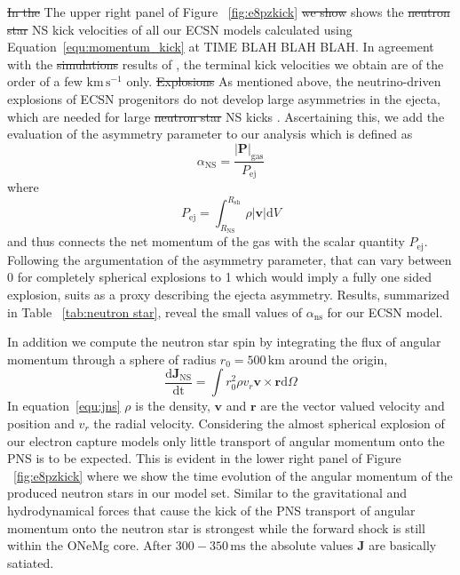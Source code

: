 \documentclass[fleqn,usenatbib]{mnras}
\newcommand{\ud}{\ensuremath{\mathrm{d}}}
\newcommand{\kms}{\ensuremath{\mathrm{km\, s^{-1}}}\xspace}
\newcommand{\NY}[2]{{\color{blue}\sout{#1}#2}}
\begin{document}
\NY{In the}{ The} upper right panel of Figure ~\ref{fig:e8pzkick} \NY{we show}{ shows} the \NY{neutron star}{ NS} kick velocities of all our ECSN models \NY{}{ calculated using Equation~\eqref{equ:momentum_kick} at TIME BLAH BLAH BLAH}. In agreement with the \NY{simulations}{ results} of \citet{Gessner2018}\NY{}{,} the terminal kick velocities \NY{}{we obtain} are of the order of a few $\kms$ only. \NY{Explosions}{ As mentioned above, the neutrino-driven explosions} of ECSN progenitors do not develop large asymmetries in the ejecta, which are needed for large \NY{neutron star}{ NS} kicks \cite{Scheck2006,Janka2017,Gessner2018}. Ascertaining this, we add the evaluation of the asymmetry parameter to our analysis which is defined as 
\begin{equation}
    \alpha_{\mathrm{NS}} = \frac{|\mathbf{P}|_{\mathrm{gas}}}{P_{\mathrm{ej}}}
\end{equation}
where 
\begin{equation}
P_{\mathrm{ej}}=\int_{R_{\mathrm{NS}}}^{R_{\mathrm{sh}}}\rho |\mathbf{v}| \ud V
\end{equation}
and thus connects the net momentum of the gas with the scalar quantity $P_{\mathrm{ej}}$. Following the argumentation of \cite{Gessner2018} the asymmetry parameter, that can vary between 0 for completely spherical explosions to 1 which would imply a fully one sided explosion, suits as a proxy describing the ejecta asymmetry. Results, summarized in Table ~\ref{tab:neutron star}, reveal the small values of $\alpha_{\mathrm{ns}}$ for our ECSN model.

In addition we compute the neutron star spin by integrating the flux of angular momentum through a sphere of radius $r_{0}=500\,\mathrm{km}$ around the origin,
\begin{equation}
\label{equ:jns}
\frac{\mathrm{d}\mathbf{J}_{\mathrm{NS}}}{\mathrm{dt}} = \int r_0^2 \rho v_r \mathbf{v}\times \mathbf{r} \mathrm{d}\Omega
\end{equation}
In equation~\ref{equ:jns} $\rho$ is the density, $\mathbf{v}$ and $\mathbf{r}$ are the vector valued velocity and position and $v_r$ the radial velocity. Considering the almost spherical explosion of our electron capture models only little transport of angular momentum onto the PNS is to be expected. This is evident in the lower right panel of Figure ~\ref{fig:e8pzkick} where we show the time evolution of the angular momentum of the produced neutron stars in our model set. Similar to the gravitational and hydrodynamical forces that cause the kick of the PNS transport of angular momentum onto the neutron star is strongest while the forward shock is still within the ONeMg core. After $300-350\,\text{ms}$ the absolute values $\mathbf{J}$ are basically satiated.
\end{document}
